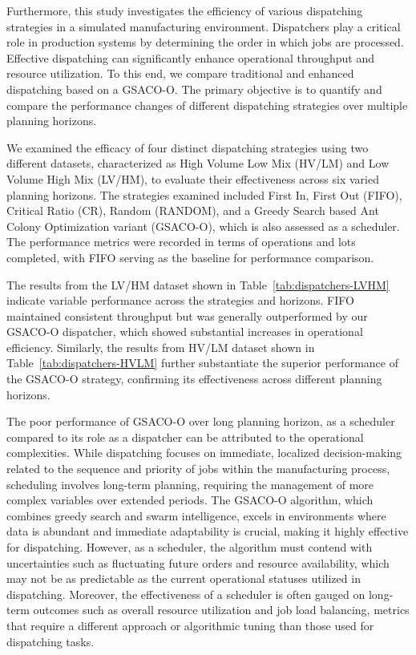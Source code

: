 Furthermore, this study investigates the efficiency of various dispatching strategies in a simulated manufacturing environment. Dispatchers play a critical role in production systems by determining the order in which jobs are processed. Effective dispatching can significantly enhance operational throughput and resource utilization. To this end, we compare traditional and enhanced dispatching based on a GSACO-O. The primary objective is to quantify and compare the performance changes of different dispatching strategies over multiple planning horizons.

We examined the efficacy of four distinct dispatching strategies using two different datasets, characterized as High Volume Low Mix (HV/LM) and Low Volume High Mix (LV/HM), to evaluate their effectiveness across six varied planning horizons. The strategies examined included First In, First Out (FIFO), Critical Ratio (CR), Random (RANDOM), and a Greedy Search based Ant Colony Optimization variant (GSACO-O), which is also assessed as a scheduler. The performance metrics were recorded in terms of operations and lots completed, with FIFO serving as the baseline for performance comparison.

The results from the LV/HM dataset shown in Table~\ref{tab:dispatchers-LVHM} indicate variable performance across the strategies and horizons. FIFO maintained consistent throughput but was generally outperformed by our GSACO-O dispatcher, which showed substantial increases in operational efficiency. Similarly, the results from HV/LM dataset shown in Table~\ref{tab:dispatchers-HVLM} further substantiate the superior performance of the GSACO-O strategy, confirming its effectiveness across different planning horizons.

The poor performance of GSACO-O over long planning horizon, as a scheduler compared to its role as a dispatcher can be attributed to the operational complexities. While dispatching focuses on immediate, localized decision-making related to the sequence and priority of jobs within the manufacturing process, scheduling involves long-term planning, requiring the management of more complex variables over extended periods. The GSACO-O algorithm, which combines greedy search and swarm intelligence, excels in environments where data is abundant and immediate adaptability is crucial, making it highly effective for dispatching. However, as a scheduler, the algorithm must contend with uncertainties such as fluctuating future orders and resource availability, which may not be as predictable as the current operational statuses utilized in dispatching. Moreover, the effectiveness of a scheduler is often gauged on long-term outcomes such as overall resource utilization and job load balancing, metrics that require a different approach or algorithmic tuning than those used for dispatching tasks.

